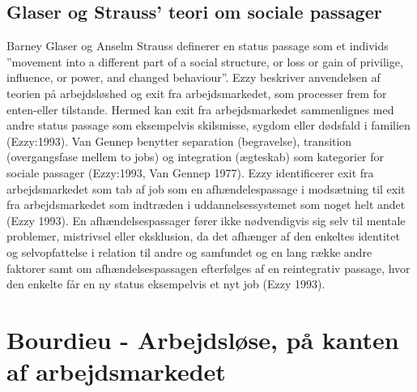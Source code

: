\subsection{Glaser og Strauss’ teori om sociale passager \label{}}
Barney Glaser og Anselm Strauss definerer en status passage som et individs ”movement into a different part of a social structure, or loss or gain of privilige, influence, or power, and changed behaviour”. Ezzy beskriver anvendelsen af teorien på arbejdsløshed og exit fra arbejdsmarkedet, som processer frem for enten-eller tilstande. Hermed kan exit fra arbejdsmarkedet sammenlignes med andre status passage som eksempelvis skilsmisse, sygdom eller dødsfald i familien (Ezzy:1993). Van Gennep benytter separation (begravelse), transition (overgangsfase mellem to jobs) og integration (ægteskab) som kategorier for sociale passager (Ezzy:1993, Van Gennep 1977). Ezzy identificerer exit fra arbejdsmarkedet som tab af job som en afhændelespassage i modsætning til exit fra arbejdsmarkedet som indtræden i uddannelsessystemet som noget helt andet (Ezzy 1993). En afhændelsespassager fører ikke nødvendigvis sig selv til mentale problemer, mistrivsel eller eksklusion, da det afhænger af den enkeltes identitet og selvopfattelse i relation til andre og samfundet og en lang række andre faktorer samt om afhændelsespassagen efterfølges af en reintegrativ passage, hvor den enkelte får en ny status eksempelvis et nyt job (Ezzy 1993).





\section{Bourdieu - Arbejdsløse, på kanten af arbejdsmarkedet \label{}}


